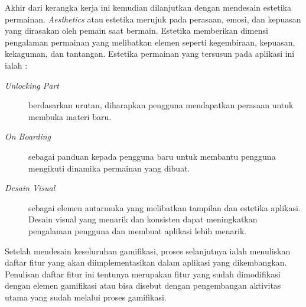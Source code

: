 Akhir dari kerangka kerja ini kemudian dilanjutkan dengan mendesain estetika permainan. \textit{Aesthetics} atau estetika merujuk pada perasaan, emosi, dan kepuasan yang dirasakan oleh pemain saat bermain. Estetika memberikan dimensi pengalaman permainan yang melibatkan elemen seperti kegembiraan, kepuasan, kekaguman, dan tantangan. Estetika permainan yang tersusun pada aplikasi ini ialah : 
\begin{description}
	\item [\textit{Unlocking Part}] berdasarkan urutan, diharapkan pengguna mendapatkan perasaan untuk membuka materi baru.
	\item [\textit{On Boarding}] sebagai panduan kepada pengguna baru untuk membantu pengguna mengikuti dinamika permainan yang dibuat.
	\item [\textit{Desain Visual}] sebagai elemen antarmuka yang melibatkan tampilan dan estetika aplikasi. Desain visual yang menarik dan konsisten dapat meningkatkan pengalaman pengguna dan membuat aplikasi lebih menarik.
\end{description}
Setelah mendesain keseluruhan gamifikasi, proses selanjutnya ialah menuliskan daftar fitur yang akan diimplementasikan dalam aplikasi yang dikembangkan.
Penulisan daftar fitur ini tentunya merupakan fitur yang sudah dimodifikasi dengan elemen gamifikasi 
atau bisa disebut dengan pengembangan aktivitas utama yang sudah melalui proses gamifikasi.
